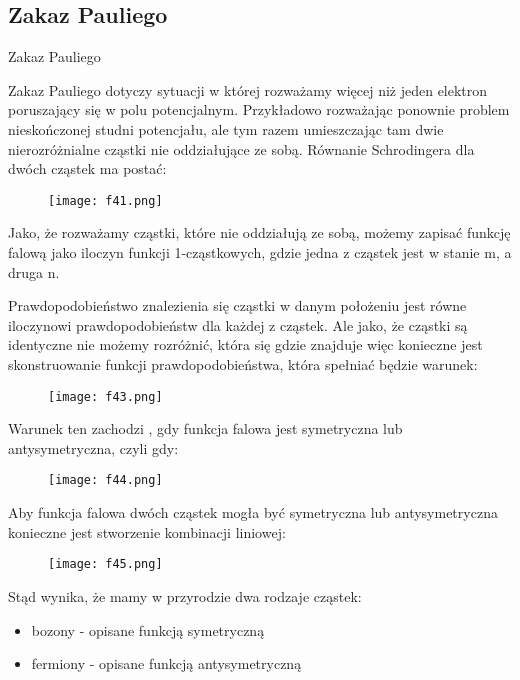 \documentclass[a4paper,15pt]{article}
\newcommand{\issue}[2]{
    \begin{tcolorbox}[colback=issueColor!5!white,colframe=issueColor,title={Zagadnienie #1}]
        #2
    \end{tcolorbox}
}
\begin{document}
\newpage
\subsection{Zakaz Pauliego}
\issue{}{
Zakaz Pauliego
}

Zakaz Pauliego dotyczy sytuacji w której rozważamy więcej niż jeden elektron poruszający się w polu potencjalnym. Przykładowo rozważając ponownie problem nieskończonej studni potencjału, ale tym razem umieszczając tam dwie nierozróżnialne cząstki nie oddziałujące ze sobą. Równanie Schrodingera dla dwóch cząstek ma postać:

\begin{figure}[H]
\centerline{\texttt{[image: f41.png]}}
\end{figure}


Jako, że rozważamy cząstki, które nie oddziałują ze sobą, możemy zapisać funkcję falową jako iloczyn funkcji 1-cząstkowych, gdzie jedna z cząstek jest w stanie m, a druga n. 

Prawdopodobieństwo znalezienia się cząstki w danym położeniu jest równe iloczynowi prawdopodobieństw dla każdej z cząstek. Ale jako, że cząstki są identyczne nie możemy rozróżnić, która się gdzie znajduje więc konieczne jest skonstruowanie funkcji prawdopodobieństwa, która spełniać będzie warunek:

\begin{figure}[H]
\centerline{\texttt{[image: f43.png]}}
\end{figure}

Warunek ten zachodzi , gdy funkcja falowa jest symetryczna lub antysymetryczna, czyli gdy:

\begin{figure}[H]
\centerline{\texttt{[image: f44.png]}}
\end{figure}

Aby funkcja falowa dwóch cząstek mogła być symetryczna lub antysymetryczna konieczne jest stworzenie kombinacji liniowej:

\begin{figure}[H]
\centerline{\texttt{[image: f45.png]}}
\end{figure}

Stąd wynika, że mamy w przyrodzie dwa rodzaje cząstek:

\begin{itemize}
\item bozony - opisane funkcją symetryczną
\item fermiony - opisane funkcją antysymetryczną
\end{itemize}
\end{document}
